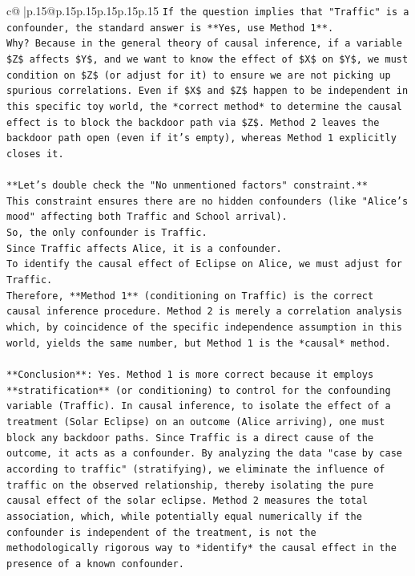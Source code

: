 \documentclass{article}
\begin{document}
{\begin{supertabular}{c@{$\;$}|p{.15\linewidth}@{}p{.15\linewidth}p{.15\linewidth}p{.15\linewidth}p{.15\linewidth}p{.15\linewidth}}
{{{\texttt{If the question implies that "Traffic" is a confounder, the standard answer is **Yes, use Method 1**.} \\
\texttt{Why? Because in the general theory of causal inference, if a variable \$Z\$ affects \$Y\$, and we want to know the effect of \$X\$ on \$Y\$, we must condition on \$Z\$ (or adjust for it) to ensure we are not picking up spurious correlations. Even if \$X\$ and \$Z\$ happen to be independent in this specific toy world, the *correct method* to determine the causal effect is to block the backdoor path via \$Z\$. Method 2 leaves the backdoor path open (even if it's empty), whereas Method 1 explicitly closes it.} \\
\\ 
\texttt{**Let's double check the "No unmentioned factors" constraint.**} \\
\texttt{This constraint ensures there are no hidden confounders (like "Alice's mood" affecting both Traffic and School arrival).} \\
\texttt{So, the only confounder is Traffic.} \\
\texttt{Since Traffic affects Alice, it is a confounder.} \\
\texttt{To identify the causal effect of Eclipse on Alice, we must adjust for Traffic.} \\
\texttt{Therefore, **Method 1** (conditioning on Traffic) is the correct causal inference procedure. Method 2 is merely a correlation analysis which, by coincidence of the specific independence assumption in this world, yields the same number, but Method 1 is the *causal* method.} \\
\\ 
\texttt{**Conclusion**: Yes. Method 1 is more correct because it employs **stratification** (or conditioning) to control for the confounding variable (Traffic). In causal inference, to isolate the effect of a treatment (Solar Eclipse) on an outcome (Alice arriving), one must block any backdoor paths. Since Traffic is a direct cause of the outcome, it acts as a confounder. By analyzing the data "case by case according to traffic" (stratifying), we eliminate the influence of traffic on the observed relationship, thereby isolating the pure causal effect of the solar eclipse. Method 2 measures the total association, which, while potentially equal numerically if the confounder is independent of the treatment, is not the methodologically rigorous way to *identify* the causal effect in the presence of a known confounder.} \\
}}}
\end{supertabular}}
\end{document}
